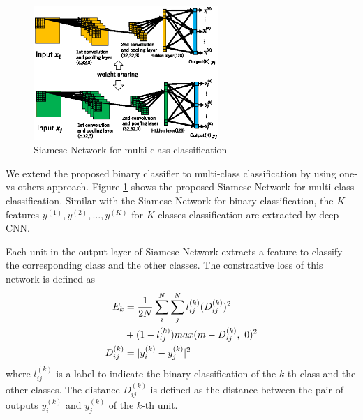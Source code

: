 \documentclass[twocolumn,10pt]{article}
\begin{document}
\begin{figure}[ht]
\begin{center}
\includegraphics[width=70mm]{figure3.eps}
\caption{Siamese Network for multi-class classification}
\label{fig:siamese-mu}
\end{center}
\end{figure}
We extend the proposed binary classifier to multi-class classification by using one-vs-others approach.
Figure \ref{fig:siamese-mu} shows the proposed Siamese Network for multi-class classification.
Similar with the Siamese Network for binary classification, the $K$ features $y^{(1)},y^{(2)},\ldots,y^{(K)}$ for $K$ classes classification are extracted by deep CNN.

Each unit in the output layer of Siamese Network extracts a feature to classify the corresponding class and the other classes.
The constrastive loss of this network is defined as
\begin{align} \label{eq:multi contrastive}
E_k&=\frac{1}{2N}\sum_i^N \sum_j^N l_{ij}^{(k)}(D^{(k)}_{ij})^2 \notag \\
&+ (1-l_{ij}^{(k)})max(m-D^{(k)}_{ij}, ~0)^2 \\
D^{(k)}_{ij}&=|y^{(k)}_{i}- y^{(k)}_{j}|^2
\end{align}
where $l_{ij}^{(k)}$ is a label to indicate the binary classification of the $k$-th class and the other classes.
The distance $D^{(k)}_{ij}$ is defined as the distance between the pair of outputs $y_i^{(k)}$ and $y_j^{(k)}$ of the $k$-th unit.
\end{document}
